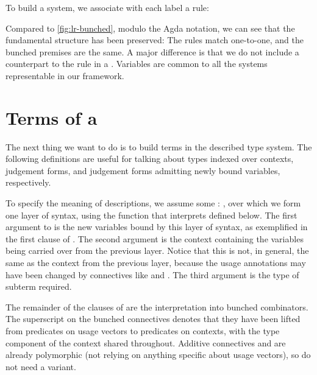 \noindent
\begin{minipage}[t]{0.5\textwidth}
\end{minipage}
\begin{minipage}[t]{0.5\textwidth}
\end{minipage}

To build a system, we associate with each label a rule:


Compared to \cref{fig:lr-bunched}, modulo the Agda notation, we can see
that the fundamental structure has been preserved: The rules match
one-to-one, and the bunched premises are the same. A major difference
is that we do not include a counterpart to the
 rule in a
. Variables are common to all the systems
representable in our framework.

\section{Terms of a }\label{sec:terms}

The next thing we want to do is to build terms in the described type system.
The following definitions are useful for talking about types indexed over
contexts, judgement forms, and judgement forms admitting newly bound variables,
respectively.


To specify the meaning of descriptions, we assume some  : ,
over which we form one layer of syntax, using the function
 that interprets
 defined below.  The first argument to
 is the new variables bound by this layer of syntax, as
exemplified in the first clause of
.  The second argument is
the context containing the variables being carried over from the
previous layer.  Notice that this is not, in general, the same as the
context from the previous layer, because the usage annotations may
have been changed by connectives like
 and
.  The third argument is the
type of subterm required.

The remainder of the clauses of 
are the interpretation into bunched combinators.
The superscript  on the bunched connectives denotes that
they have been lifted from predicates on usage vectors to predicates on
contexts, with the type component of the context shared throughout.
Additive connectives  and \AgdaFunction{$\dottimes$} are
already polymorphic (not relying on anything specific about usage vectors), so
do not need a  variant.

